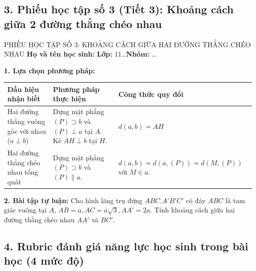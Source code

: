 \documentclass[12pt, a4paper]{article}
\begin{document}
\begin{itemize}[leftmargin=1.2cm]
\subsection*{3. Phiếu học tập số 3 (Tiết 3): Khoảng cách giữa 2 đường thẳng chéo nhau}

\begin{pedabox}{PHIẾU HỌC TẬP SỐ 3: KHOẢNG CÁCH GIỮA HAI ĐƯỜNG THẲNG CHÉO NHAU}
    \textbf{Họ và tên học sinh:} \dotfill \textbf{Lớp:} 11\dots \textbf{Nhóm:} \dots

    \textbf{1. Lựa chọn phương pháp:}
    \begin{center}
    \begin{tabular}{|p{4.5cm}|p{5cm}|p{5.5cm}|}
    \hline
    \textbf{Dấu hiệu nhận biết} & \textbf{Phương pháp thực hiện} & \textbf{Công thức quy đổi} \\ \hline
    Hai đường thẳng vuông góc với nhau ($a \perp b$) & Dựng mặt phẳng $(P) \supset b$ và $(P) \perp a$ tại $A$. Kẻ $AH \perp b$ tại $H$. & $d(a, b) = AH$ \\ \hline
    Hai đường thẳng chéo nhau tổng quát & Dựng mặt phẳng $(P) \supset b$ và $(P) \parallel a$. & $d(a, b) = d(a, (P)) = d(M, (P))$ với $M \in a$. \\ \hline
    \end{tabular}
    \end{center}

    \textbf{2. Bài tập tự luận:}
    Cho hình lăng trụ đứng $ABC.A'B'C'$ có đáy $ABC$ là tam giác vuông tại $A$, $AB = a, AC = a\sqrt{3}, AA' = 2a$.
    Tính khoảng cách giữa hai đường thẳng chéo nhau $AA'$ và $BC'$.
\end{pedabox}

\subsection*{4. Rubric đánh giá năng lực học sinh trong bài học (4 mức độ)}


\end{itemize}
\end{document}
